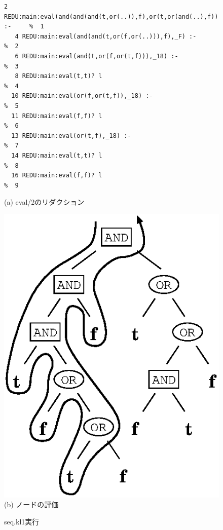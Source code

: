 \documentclass[a4,titlepage]{jsreport}
\begin{document}
\begin{figure}[t]
\begin{center}
\begin{Verbatim}[baselinestretch=0.8]
   2 REDU:main:eval(and(and(and(t,or(..)),f),or(t,or(and(..),f))),_3) :-     %  1
   4 REDU:main:eval(and(and(t,or(f,or(..))),f),_F) :-                        %  2
   6 REDU:main:eval(and(t,or(f,or(t,f))),_18) :-                             %  3
   8 REDU:main:eval(t,t)? l                                                  %  4
  10 REDU:main:eval(or(f,or(t,f)),_18) :-                                    %  5
  11 REDU:main:eval(f,f)? l                                                  %  6
  13 REDU:main:eval(or(t,f),_18) :-                                          %  7
  14 REDU:main:eval(t,t)? l                                                  %  8
  16 REDU:main:eval(f,f)? l                                                  %  9

\end{Verbatim}

(a) eval/2のリダクション\\
\vspace{8mm}

\includegraphics{fig/andor_tree2_seq.eps}\\
(b) ノードの評価
\caption{seq.kl1実行}
\label{andor_seq_log}
\end{center}
\end{figure}
\end{document}
